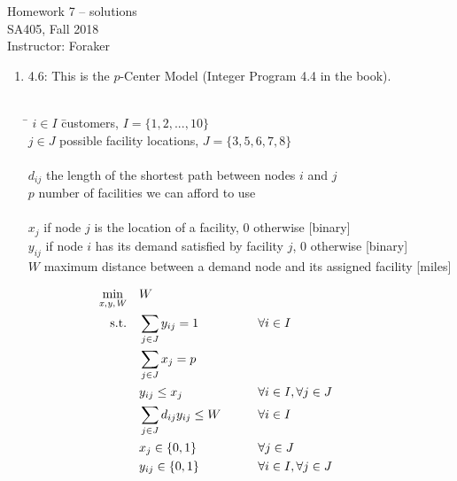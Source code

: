 \documentclass[10pt]{article}
\begin{document}
\begin{center}
  {\sc Homework 7 -- solutions}\\
  {\sc SA405, Fall 2018} \\
  {\sc Instructor: Foraker}
\end{center}

\medskip

\begin{enumerate} 

\item 4.6: This is the $p$-Center Model (Integer Program 4.4 in the book).

\begin{tabbing}
\\[0.2cm]
\hspace*{.5cm} \= $i\in I$ \hspace{2.8cm} \= customers, $I=\{1,2,...,10\}$ \\
\> $j\in J$ \> possible facility locations, $J=\{3,5,6,7,8\}$\\[0.2cm]
\\[0.2cm] 
\> $d_{ij}$ \> the length of the shortest path between nodes $i$ and $j$ \\
\> $p$  \> number of facilities we can afford to use\\[0.2cm]
\\
\> $x_j$  if node $j$ is the location of a facility, 0 otherwise  [binary] \\
\> $y_{ij}$  if node $i$ has its demand satisfied by facility $j$, 0 otherwise  [binary] \\
\> $W$ \> maximum distance between a demand node and its assigned facility [miles] \\[0.2cm] 
\end{tabbing}
\begin{alignat}{3}
\min_{ \tiny{\it x, y, W}} \quad & W \\
\mbox{s.t.} \quad & \sum_{j\in J} y_{ij} = 1 &\qquad&  \forall i \in I &\qquad& \\
& \sum_{j \in J} x_j = p &&  \\
& y_{ij} \le x_j &\qquad& \forall i \in I, \forall j \in J\\
& \sum_{j \in J} d_{ij} y_{ij} \le W &\qquad& \forall i \in I \\
& x_j \in \{0,1\} && \forall j\in J \\
 & y_{ij} \in \{0,1\} && \forall i\in I, \forall j \in J
\end{alignat}


\end{enumerate}
\end{document}
